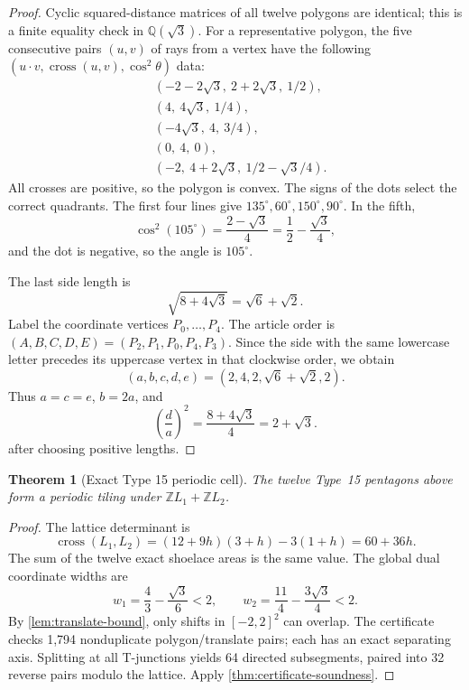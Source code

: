 \documentclass[11pt]{article}
\newtheorem{theorem}{Theorem}[section]
\theoremstyle{remark}
\newcommand{\Z}{\mathbb Z}
\newcommand{\Q}{\mathbb Q}
\newcommand{\cross}{\operatorname{cross}}
\newcommand{\Qsqrt}[1]{\Q(\sqrt{#1})}
\begin{document}
\begin{proof}
Cyclic squared-distance matrices of all twelve polygons are identical; this is
a finite equality check in \(\Qsqrt3\).  For a representative polygon, the
five consecutive pairs \((u,v)\) of rays from a vertex have the following
\((u\cdot v,\cross(u,v),\cos^2\theta)\) data:
\begin{align*}
&(-2-2\sqrt3,\ 2+2\sqrt3,\ 1/2),\\
&(4,\ 4\sqrt3,\ 1/4),\\
&(-4\sqrt3,\ 4,\ 3/4),\\
&(0,\ 4,\ 0),\\
&(-2,\ 4+2\sqrt3,\ 1/2-\sqrt3/4).
\end{align*}
All crosses are positive, so the polygon is convex.  The signs of the dots
select the correct quadrants.  The first four lines give
\(135^\circ,60^\circ,150^\circ,90^\circ\).  In the fifth,
\[
 \cos^2(105^\circ)=\frac{2-\sqrt3}{4}
 =\frac12-\frac{\sqrt3}{4},
\]
and the dot is negative, so the angle is \(105^\circ\).

The last side length is
\[
 \sqrt{8+4\sqrt3}=\sqrt6+\sqrt2.
\]
Label the coordinate vertices \(P_0,\ldots,P_4\).  The article order is
\((A,B,C,D,E)=(P_2,P_1,P_0,P_4,P_3)\).  Since the side with the same lowercase
letter precedes its uppercase vertex in that clockwise order, we obtain
\[
 (a,b,c,d,e)=(2,4,2,\sqrt6+\sqrt2,2).
\]
Thus \(a=c=e\), \(b=2a\), and
\[
 \left(\frac da\right)^2=\frac{8+4\sqrt3}{4}=2+\sqrt3.
\]
after choosing positive lengths.
\end{proof}

\begin{theorem}[Exact Type 15 periodic cell]
\label{thm:type15-cell}
The twelve Type~15 pentagons above form a periodic tiling under
\(\Z L_1+\Z L_2\).
\end{theorem}

\begin{proof}
The lattice determinant is
\[
 \cross(L_1,L_2)
 =(12+9h)(3+h)-3(1+h)
 =60+36h.
\]
The sum of the twelve exact shoelace areas is the same value.  The global dual
coordinate widths are
\[
 w_1=\frac43-\frac{\sqrt3}{6}<2,
 \qquad
 w_2=\frac{11}{4}-\frac{3\sqrt3}{4}<2.
\]
By \cref{lem:translate-bound}, only shifts in \([-2,2]^2\) can overlap.  The
certificate checks 1,794 nonduplicate polygon/translate pairs; each has an
exact separating axis.  Splitting at all T-junctions yields 64 directed
subsegments, paired into 32 reverse pairs modulo the lattice.  Apply
\cref{thm:certificate-soundness}.
\end{proof}
\end{document}
